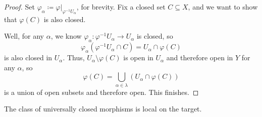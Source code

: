 \documentclass[../notes.tex]{subfiles}
\begin{document}
\begin{proof}
	Set $\varphi_\alpha\coloneqq\varphi|_{\varphi^{-1}U_\alpha}$, for brevity. Fix a closed set $C\subseteq X$, and we want to show that $\varphi(C)$ is also closed.

	Well, for any $\alpha$, we know $\varphi_\alpha\colon\varphi^{-1}U_\alpha\to U_\alpha$ is closed, so
	\[\varphi_\alpha\left(\varphi^{-1}U_\alpha\cap C\right)=U_\alpha\cap\varphi(C)\]
	is also closed in $U_\alpha$. Thus, $U_\alpha\setminus\varphi(C)$ is open in $U_\alpha$ and therefore open in $Y$ for any $\alpha$, so
	\[\varphi(C)=\bigcup_{\alpha\in\lambda}(U_\alpha\cap\varphi(C))\]
	is a union of open subsets and therefore open. This finishes.
\end{proof}
\begin{lemma} \label{lem:univ-closed-is-local-target}
	The class of universally closed morphisms is local on the target.
\end{lemma}
\end{document}
